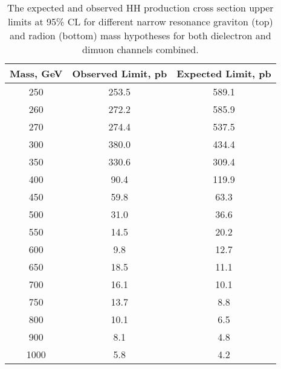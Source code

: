 \begin{table}
\begin{center}
\caption{The expected and observed HH production cross section upper limits at 95\% CL for different
narrow resonance graviton (top) and radion (bottom) mass hypotheses for both dielectron and dimuon channels combined.}
\label{tab:finalLimits}
\begin{tabular}{|c|c|c|}
\hline
Mass, GeV &  Observed Limit, pb &  Expected Limit, pb \\
\hline
      250 &               253.5 &               589.1 \\
      260 &               272.2 &               585.9 \\
      270 &               274.4 &               537.5 \\
      300 &               380.0 &               434.4 \\
      350 &               330.6 &               309.4 \\
      400 &                90.4 &               119.9 \\
      450 &                59.8 &                63.3 \\
      500 &                31.0 &                36.6 \\
      550 &                14.5 &                20.2 \\
      600 &                 9.8 &                12.7 \\
      650 &                18.5 &                11.1 \\
      700 &                16.1 &                10.1 \\
      750 &                13.7 &                 8.8 \\
      800 &                10.1 &                 6.5 \\
      900 &                 8.1 &                 4.8 \\
     1000 &                 5.8 &                 4.2 \\
\hline
\end{tabular}

\end{center}
\end{table}
